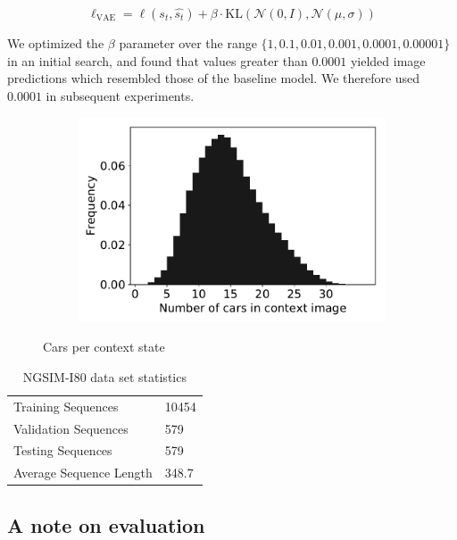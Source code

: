 \documentclass{article}
\begin{document}
\begin{appendices}
\begin{equation}
  \ell_{\text{VAE}} = \ell(s_t, \hat{s_t}) + \beta \cdot \mbox{KL}(\mathcal{N}(0, I), \mathcal{N}(\mu, \sigma))
\end{equation}

We optimized the $\beta$ parameter over the range $\{1, 0.1, 0.01, 0.001, 0.0001, 0.00001 \}$ in an initial search, and found that values greater than $0.0001$ yielded image predictions which resembled those of the baseline model.
We therefore used $0.0001$ in subsequent experiments.

\begin{figure}
  \centering
  \begin{subfigure}[b]{0.5\textwidth}
    \includegraphics[width=\textwidth]{images/car_statistics.pdf}
  \end{subfigure}
  \caption{Cars per context state}
  \label{car-statistics}
\end{figure}

\begin{table}
  \caption{NGSIM-I80 data set statistics}
  \label{i80-stats}
  \centering
  \begin{tabular}{ll}
    \toprule
    Training Sequences     & 10454 \\
    Validation Sequences & 579 \\
    Testing Sequences & 579 \\
    Average Sequence Length & 348.7 \\
    \bottomrule
  \end{tabular}
\end{table}

\subsection{A note on evaluation} \label{proof}


\end{appendices}
\end{document}

